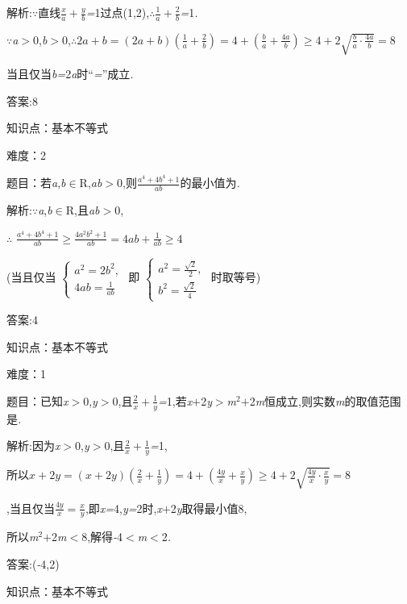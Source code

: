 \documentclass{article} %
\begin{document}
 解析:\textit{$\because$}直线$\frac{x}{a}+\frac{y}{b}$\textit{=}1过点(1,2),\textit{$\therefore$}$\frac{1}{a}+\frac{2}{b}$\textit{=}1\textit{.}

\textit{$\because$a$>$}0,\textit{b$>$}0,\textit{$\therefore$}$2a+b=(2a+b)(\frac{1}{a}+\frac{2}{b})=4+(\frac{b}{a}+\frac{4a}{b}) \ge 4+2\sqrt{\frac{b}{a}\cdot \frac{4a}{b}}=8$

当且仅当\textit{b=}2\textit{a}时``\textit{=}''成立\textit{.}

 答案:8

知识点：基本不等式

难度：2

 题目：若\textit{a},\textit{b}$\mathrm{\in}$R,\textit{ab$>$}0,则$\frac{a^4+4b^4+1}{ab}$的最小值为\textit{\underbar{　　　　　}.~}

 解析:\textit{$\because$a},\textit{b}$\mathrm{\in}$R,且\textit{ab$>$}0,

\textit{$\therefore$}
$\frac{a^4+4b^4+1}{ab} \ge \frac{4a^2b^2+1}{ab}=4ab+\frac{1}{ab}\ge 4$

(当且仅当
$
\begin{cases}
a^2=2b^2,\\
4ab=\frac{1}{ab}
\end{cases}$
即
$
\begin{cases}
a^2=\frac{\sqrt{2}}{2},\\
b^2=\frac{\sqrt{2}}{4}
\end{cases}$
时取等号)

 答案:4

知识点：基本不等式

难度：1

 题目：已知\textit{x$>$}0,\textit{y$>$}0,且$\frac{2}{x}+\frac{1}{y}$\textit{=}1,若\textit{x$+$}2\textit{y$>$m}${}^{2}$\textit{$+$}2\textit{m}恒成立,则实数\textit{m}的取值范围是\textit{\underbar{　　　　　}.~}

 解析:因为\textit{x$>$}0,\textit{y$>$}0,且$\frac{2}{x}+\frac{1}{y}$\textit{=}1,

所以$x+2y=(x+2y)(\frac{2}{x}+\frac{1}{y})=4+(\frac{4y}{x}+\frac{x}{y}) \ge 4+2\sqrt{\frac{4y}{x} \cdot \frac{x}{y}}=8$

,当且仅当$\frac{4y}{x} = \frac{x}{y}$,即\textit{x=}4,\textit{y=}2时,\textit{x$+$}2\textit{y}取得最小值8,

所以\textit{m}${}^{2}$\textit{$+$}2\textit{m$<$}8,解得\textit{-}4\textit{$<$m$<$}2\textit{.}

 答案:(\textit{-}4,2)

知识点：基本不等式
\end{document}
